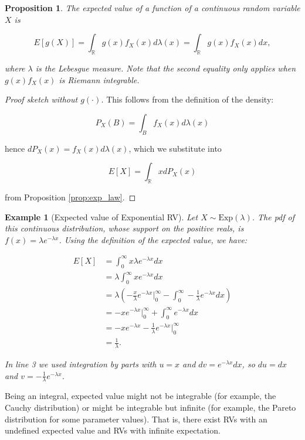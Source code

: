 \documentclass{book}
\theoremstyle{plain}%
\newtheorem{prototheorem}{Example}[section]
\newenvironment{cexample}
   {\colorlet{shadecolor}{gray!10}\begin{shaded}\begin{prototheorem}}
   {\end{prototheorem}\end{shaded}}
\newtheorem{proposition}{Proposition}[section]
\theoremstyle{definition}
\begin{document}
\begin{proposition}
The expected value of a function of a continuous random variable $X$ is

$$E[g(X)] = \int_\mathbb{R} g(x) f_X(x) d\lambda(x) = \int_\mathbb{R} g(x) f_X(x) dx,$$

where $\lambda$ is the Lebesgue measure. Note that the second equality only applies when $g(x)f_X(x)$ is Riemann integrable.
\end{proposition}

\begin{proof}[Proof sketch without $g(\cdot)$]
This follows from the definition of the density:

$$P_X(B) = \int_B f_X(x) d\lambda(x)$$

hence $dP_X(x) = f_X(x) d\lambda(x)$, which we substitute into

$$E[X] = \int_{\mathbb{R}} x dP_X(x)$$

from Proposition \ref{prop:exp_law}.

\end{proof}

\begin{cexample}[Expected value of Exponential RV]
Let $X \sim \text{Exp}(\lambda)$. The pdf of this continuous distribution, whose support on the positive reals, is $f(x) = \lambda e^{-\lambda x}$. Using the definition of the expected value, we have:

\begin{align*}
E[X] &= \int_0^\infty x \lambda e^{-\lambda x} dx \\
&= \lambda \int_0^\infty x e^{-\lambda x} dx \\
&= \lambda\left(-\frac{x}{\lambda}e^{-\lambda x}\bigg\rvert_0^\infty -  \int_0^\infty -\frac{1}{\lambda}e^{-\lambda x} dx\right)\\
&= -xe^{-\lambda x}\bigg\rvert_0^\infty + \int_0^\infty e^{-\lambda x} dx\\
&= -xe^{-\lambda x} -  \frac{1}{\lambda}e^{-\lambda x} \bigg\rvert_0^\infty \\
&= \frac{1}{\lambda}.
\end{align*}

In line 3 we used integration by parts with $u = x$ and $dv = e^{-\lambda x} dx$, so $du = dx$ and $v = -\frac{1}{\lambda}e^{-\lambda x}$.
\end{cexample}

Being an integral, expected value might not be integrable (for example, the Cauchy distribution) or might be integrable but infinite (for example, the Pareto distribution for some parameter values). That is, there exist RVs with an undefined expected value and RVs with infinite expectation.
\end{document}
